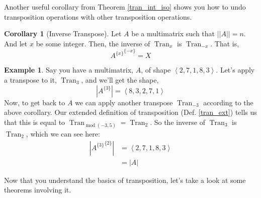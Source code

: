 \documentclass[12pt]{book}
\theoremstyle{plain}
\theoremstyle{definition}
\newtheorem{corollary}{Corollary}[theorem]
\newtheorem{example}{Example}[chapter]
\theoremstyle{ppart}
\theoremstyle{case}
\theoremstyle{solution}
\DeclareMathOperator{\Tran}{Tran}
\DeclareMathOperator{\remainder}{mod}
\newcommand{\shape}[1]{\left|#1\right|}
\newcommand{\transpose}[2]{{#1}^{\{#2\}}}
\begin{document}
Another useful corollary from Theorem \ref{tran_int_iso} shows you how to
undo transposition operations with other transposition operations.

\begin{corollary}[Inverse Transpose]
Let $A$ be a multimatrix such that $\shape{\shape{A}} = n$. And let
$x$ be some integer. Then, the inverse of $\Tran_x$ is
$\Tran_{-x}$. That is,
\[ \transpose{\transpose{A}{x}}{-x} = X \]
\end{corollary}

\begin{example}
Say you have a multimatrix, $A$, of shape $\left<2,7,1,8,3\right>$.
Let's apply a transpose to it, $\Tran_3$, and we'll get the shape,
\[ \shape{\transpose{A}{3}} = \left<8,3,2,7,1\right> \]
Now, to get back to $A$ we can apply another transpose $\Tran_{-3}$ according
to the above corollary.
Our extended definition of transposition (Def. \ref{tran_ext})
tells us that this is equal to $\Tran_{\remainder(-3, 5)} = \Tran_{2}$.
So the inverse of $\Tran_3$ is $\Tran_2$, which we can see here:
\begin{align*}
  \shape{\transpose{\transpose{A}{3}}{2}}
  &= \left<2,7,1,8,3\right> \\
  &= \shape{A}
\end{align*}
\end{example}

Now that you understand the basics of transposition, let's take a look
at some theorems involving it.
\end{document}
